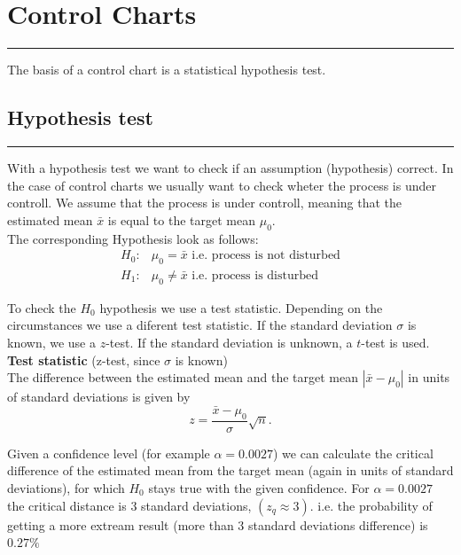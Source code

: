 \section{Control Charts}
\noindent\rule[\linienAbstand]{\linewidth}{\linienDickeDick}
The basis of a control chart is a statistical hypothesis test.

\subsection{Hypothesis test}
\noindent\rule[\linienAbstand]{\linewidth}{\linienDicke}
With a hypothesis test we want to check if an assumption (hypothesis) correct. In the case of control charts we usually want to check wheter the process is under controll. We assume that the process is under controll, meaning that the estimated mean $\bar{x}$ is equal to the target mean $\mu_0$.\\
The corresponding Hypothesis look as follows:
\begin{equation}
  \begin{split}
    H_0:& \mu_0 = \bar{x} \text{ i.e. process is not disturbed}\\
    H_1:& \mu_0 \neq \bar{x} \text{ i.e. process is disturbed}
  \end{split}
\end{equation}

To check the $H_0$ hypothesis we use a test statistic. Depending on the circumstances we use a diferent test statistic. If the standard deviation $\sigma$ is known, we use a $z$-test. If the standard deviation is unknown, a $t$-test is used.\\

\textbf{Test statistic} (z-test, since $\sigma$ is known)\\
The difference between the estimated mean and the target mean $|\bar{x} - \mu_0|$ in units of standard deviations is given by
\begin{equation}
  z = \frac{\bar{x}-\mu_0}{\sigma}\sqrt{n}.
\end{equation}

Given a confidence level (for example $\alpha = 0.0027$) we can calculate the critical difference of the estimated mean from the target mean (again in units of standard deviations), for which $H_0$ stays true with the given confidence. For $\alpha = 0.0027$ the critical distance is 3 standard deviations, $(z_q \approx 3)$. i.e. the probability of getting a more extream result (more than 3 standard deviations difference) is $0.27\%$\\

